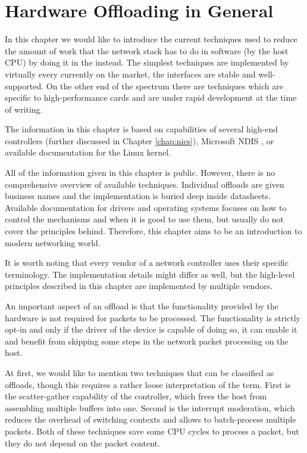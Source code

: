 \chapter{Hardware Offloading in General}
\label{chap:offloading}

In this chapter we would like to introduce the current techniques used to reduce
the amount of work that the network stack has to do in software (by the host CPU)
by doing it in the  instead. The simplest techniques are implemented by
virtually every  currently on the market, the interfaces are stable and
well-supported. On the other end of the spectrum there are techniques which
are specific to high-performance cards and are under rapid development at the
time of writing.

The information in this chapter is based on capabilities of several high-end
controllers (further discussed in Chapter \ref{chap:nics}), Microsoft \acrfull{NDIS}
\cite{NDIS}, or available documentation for the Linux kernel.

All of the information given in this chapter is public. However, there is no
comprehensive overview of available techniques. Individual offloads are given
business names and the implementation is buried deep inside datasheets.
Available documentation for drivers and operating systems focuses on how to
control the mechanisms and when it is good to use them, but usually do not
cover the principles behind. Therefore, this chapter aims to be an introduction
to modern networking world.

It is worth noting that every vendor of a network controller uses their
specific terminology. The implementation details might differ as well, but the
high-level principles described in this chapter are implemented by multiple
 vendors.

An important aspect of an offload is that the functionality provided by
the hardware is not required for packets to be processed. The functionality is
strictly opt-in and only if the driver of the device is capable of doing so, it
can enable it and benefit from skipping some steps in the network packet
processing on the host.

At first, we would like to mention two techniques that can be
classified as offloads, though this requires a rather loose interpretation of the
term. First is the scatter-gather capability of the controller, which frees the
host from assembling multiple buffers into one. Second is the interrupt
moderation, which reduces the overhead of switching contexts and allows to
batch-process multiple packets. Both of these techniques save some CPU cycles to
process a packet, but they do not depend on the packet content.

